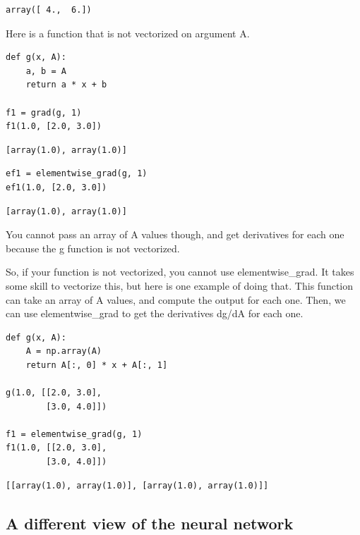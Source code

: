 \documentclass[11pt]{article}
\begin{document}
\begin{verbatim}
array([ 4.,  6.])
\end{verbatim}

Here is a function that is not vectorized on argument A.

\begin{verbatim}
def g(x, A):
    a, b = A
    return a * x + b

f1 = grad(g, 1)
f1(1.0, [2.0, 3.0])
\end{verbatim}

\begin{verbatim}
[array(1.0), array(1.0)]
\end{verbatim}

\begin{verbatim}
ef1 = elementwise_grad(g, 1)
ef1(1.0, [2.0, 3.0])
\end{verbatim}

\begin{verbatim}
[array(1.0), array(1.0)]
\end{verbatim}

You cannot pass an array of A values though, and get derivatives for each one because the g function is not vectorized.

So, if your function is not vectorized, you cannot use elementwise\_grad. It takes some skill to vectorize this, but here is one example of doing that. This function can take an array of A values, and compute the output for each one. Then, we can use elementwise\_grad to get the derivatives dg/dA for each one.

\begin{verbatim}
def g(x, A):
    A = np.array(A)
    return A[:, 0] * x + A[:, 1]

g(1.0, [[2.0, 3.0],
        [3.0, 4.0]])

f1 = elementwise_grad(g, 1)
f1(1.0, [[2.0, 3.0],
        [3.0, 4.0]])
\end{verbatim}

\begin{verbatim}
[[array(1.0), array(1.0)], [array(1.0), array(1.0)]]
\end{verbatim}

\subsection{A different view of the neural network}
\label{sec:org1007012}
\end{document}
